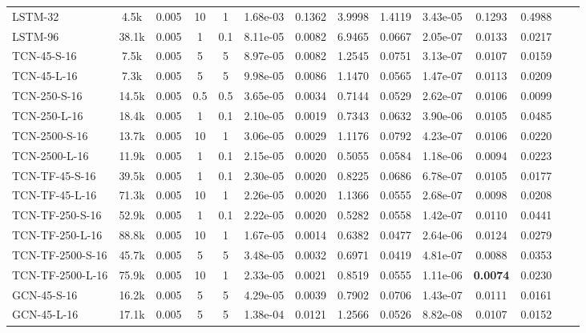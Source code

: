 \begin{table*}[h]
{\begin{tabular}{lccccccccccccc}
            \hline
            LSTM-32 & 4.5k & 0.005 & 10 & 1 & 1.68e-03 & 0.1362 & 3.9998 & 1.4119 & 3.43e-05 & 0.1293 & 0.4988 \\
            LSTM-96 & 38.1k & 0.005 & 1 & 0.1 & 8.11e-05 & 0.0082 & 6.9465 & 0.0667 & 2.05e-07 & 0.0133 & 0.0217 \\
            \hline
            TCN-45-S-16 & 7.5k & 0.005 & 5 & 5 & 8.97e-05 & 0.0082 & 1.2545 & 0.0751 & 3.13e-07 & 0.0107 & 0.0159 \\
            TCN-45-L-16 & 7.3k & 0.005 & 5 & 5 & 9.98e-05 & 0.0086 & 1.1470 & 0.0565 & 1.47e-07 & 0.0113 & 0.0209 \\
            TCN-250-S-16 & 14.5k & 0.005 & 0.5 & 0.5 & 3.65e-05 & 0.0034 & 0.7144 & 0.0529 & 2.62e-07 & 0.0106 & 0.0099 \\
            TCN-250-L-16 & 18.4k & 0.005 & 1 & 0.1 & 2.10e-05 & 0.0019 & 0.7343 & 0.0632 & 3.90e-06 & 0.0105 & 0.0485 \\
            TCN-2500-S-16 & 13.7k & 0.005 & 10 & 1 & 3.06e-05 & 0.0029 & 1.1176 & 0.0792 & 4.23e-07 & 0.0106 & 0.0220 \\
            TCN-2500-L-16 & 11.9k & 0.005 & 1 & 0.1 & 2.15e-05 & 0.0020 & 0.5055 & 0.0584 & 1.18e-06 & 0.0094 & 0.0223 \\
            \hline
            TCN-TF-45-S-16 & 39.5k & 0.005 & 1 & 0.1 & 2.30e-05 & 0.0020 & 0.8225 & 0.0686 & 6.78e-07 & 0.0105 & 0.0177 \\
            TCN-TF-45-L-16 & 71.3k & 0.005 & 10 & 1 & 2.26e-05 & 0.0020 & 1.1366 & 0.0555 & 2.68e-07 & 0.0098 & 0.0208 \\
            TCN-TF-250-S-16 & 52.9k & 0.005 & 1 & 0.1 & 2.22e-05 & 0.0020 & 0.5282 & 0.0558 & 1.42e-07 & 0.0110 & 0.0441 \\
            TCN-TF-250-L-16 & 88.8k & 0.005 & 10 & 1 & 1.67e-05 & 0.0014 & 0.6382 & 0.0477 & 2.64e-06 & 0.0124 & 0.0279 \\
            TCN-TF-2500-S-16 & 45.7k & 0.005 & 5 & 5 & 3.48e-05 & 0.0032 & 0.6971 & 0.0419 & 4.81e-07 & 0.0088 & 0.0353 \\
            TCN-TF-2500-L-16 & 75.9k & 0.005 & 10 & 1 & 2.33e-05 & 0.0021 & 0.8519 & 0.0555 & 1.11e-06 & \textbf{0.0074} & 0.0230 \\
            \hline
            GCN-45-S-16 & 16.2k & 0.005 & 5 & 5 & 4.29e-05 & 0.0039 & 0.7902 & 0.0706 & 1.43e-07 & 0.0111 & 0.0161 \\
            GCN-45-L-16 & 17.1k & 0.005 & 5 & 5 & 1.38e-04 & 0.0121 & 1.2566 & 0.0526 & 8.82e-08 & 0.0107 & 0.0152 \\

\end{tabular}}
\end{table*}
